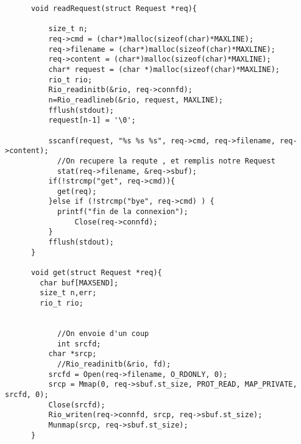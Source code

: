 \documentclass{report}
\begin{document}
\begin{lstlisting}
      void readRequest(struct Request *req){

          size_t n;
          req->cmd = (char*)malloc(sizeof(char)*MAXLINE);
          req->filename = (char*)malloc(sizeof(char)*MAXLINE);
          req->content = (char*)malloc(sizeof(char)*MAXLINE);
          char* request = (char *)malloc(sizeof(char)*MAXLINE);
          rio_t rio;
          Rio_readinitb(&rio, req->connfd);
          n=Rio_readlineb(&rio, request, MAXLINE);
          fflush(stdout);
          request[n-1] = '\0';

          sscanf(request, "%s %s %s", req->cmd, req->filename, req->content);
      		//On recupere la requte , et remplis notre Request
      		stat(req->filename, &req->sbuf);
          if(!strcmp("get", req->cmd)){
          	get(req);
          }else if (!strcmp("bye", req->cmd) ) {
          	printf("fin de la connexion");
      			Close(req->connfd);
          }
          fflush(stdout);
      }

      void get(struct Request *req){
      	char buf[MAXSEND];
      	size_t n,err;
      	rio_t rio;


      		//On envoie d'un coup
      		int srcfd;
          char *srcp;
      		//Rio_readinitb(&rio, fd);
          srcfd = Open(req->filename, O_RDONLY, 0);
          srcp = Mmap(0, req->sbuf.st_size, PROT_READ, MAP_PRIVATE, srcfd, 0);
          Close(srcfd);
          Rio_writen(req->connfd, srcp, req->sbuf.st_size);
          Munmap(srcp, req->sbuf.st_size);
      }
      \end{lstlisting}
\end{document}
